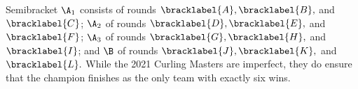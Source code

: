 {    

    Semibracket $\A_1$ consists of rounds $\bracklabel{A}, \bracklabel{B},$ and $\bracklabel{C}$; $\A_2$ of rounds $\bracklabel{D}, \bracklabel{E},$ and $\bracklabel{F}$; $\A_3$ of rounds $\bracklabel{G}, \bracklabel{H},$ and $\bracklabel{I}$; and $\B$ of rounds $\bracklabel{J}, \bracklabel{K},$ and $\bracklabel{L}.$ While the 2021 Curling Masters are imperfect, they do ensure that the champion finishes as the only team with exactly six wins.

}